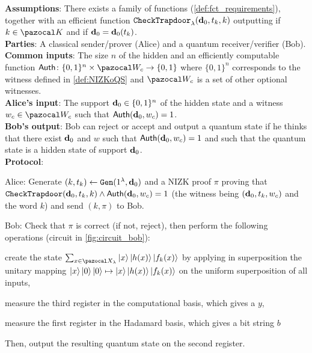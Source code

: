 \begin{protocol}
  \caption{\blindZK{}}\label{protocol:blindZK}
  \textbf{Assumptions}: There exists a \AssumpFctNegl{} family of functions (\cref{def:fct_requirements}), together with an efficient function ${\tt CheckTrapdoor}_\lambda(\mathbf{d}_0, t_k, k)$ outputting \pctrue{} if $k \in \cK$ and if $\mathbf{d}_0 = \mathbf{d}_0(t_k)$.\\
  \textbf{Parties}: A classical sender/prover (Alice) and a quantum receiver/verifier (Bob).\\
  \textbf{Common inputs}: The size $n$ of the hidden \GHZ{} and an efficiently computable function $\Auth\colon \{0,1\}^n \times \cW_c \rightarrow \{0,1\}$ where $\{0,1\}^n$ corresponds to the witness defined in \cref{def:NIZKoQS} and $\cW_c$ is a set of other optional witnesses.\\
  \textbf{Alice's input}: The support $\mathbf{d}_0 \in \{0,1\}^n$ of the hidden \GHZ{} state and a witness $w_c \in \cW_c$ such that ${\sf Auth}(\mathbf{d}_0,w_c) = 1$.\\
  \textbf{Bob's output}: Bob can reject or accept and output a quantum state if he thinks that there exist $\mathbf{d}_0$ and $w$ such that ${\sf Auth}(\mathbf{d}_0,w_c) = 1$ and such that the quantum state is a hidden \GHZ{} state of support $\mathbf{d}_0$.\\
  \textbf{Protocol}:\\
  \begin{compressedList}
  \item Alice: Generate $(k,t_k) \gets {\tt Gen}(1^\lambda, \mathbf{d}_0)$ and a NIZK proof $\pi$ proving that ${\tt CheckTrapdoor}(\mathbf{d}_0,t_k,k) \land {\sf Auth}(\mathbf{d}_0,w_c)=1$ (the witness being $(\mathbf{d}_0,t_k,w_c)$ and the word $k$) and send $(k,\pi)$ to Bob.
  \item Bob: Check that $\pi$ is correct (if not, reject), then perform the following operations (circuit in \cref{fig:circuit_bob}):
    \begin{compressedList}
    \item create the state $\sum_{x \in \cX_\lambda} \ket{x}\ket{h(x)}\ket{f_k(x)}$ by applying in superposition the unitary mapping $\ket{x}\ket{0}\ket{0} \mapsto \ket{x}\ket{h(x)}\ket{f_k(x)}$ on the uniform superposition of all inputs,
    \item measure the third register in the computational basis, which gives a $y$,
    \item measure the first register in the Hadamard basis, which gives a bit string $b$
    \end{compressedList}
    Then, output the resulting quantum state on the second register.
  \end{compressedList}
\end{protocol}



